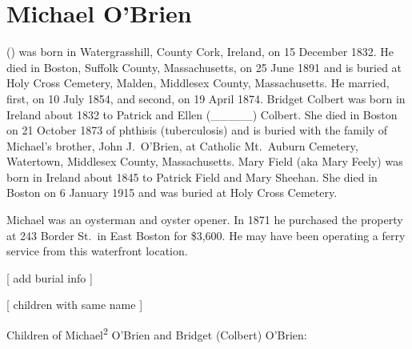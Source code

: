 \section{Michael O'Brien}

 () was born in Watergrasshill, County Cork, Ireland, on 15 December 1832.\cite{Michael2OBrienNaturalization} He died in Boston, Suffolk County, Massachusetts, on 25 June 1891\cite{Michael2OBrienDeath} and is buried at Holy Cross Cemetery, Malden, Middlesex County, Massachusetts.\cite{DianaBerberenaLetter2} He married, first,  on 10 July 1854,\cite{BridgetColbertMarriage} and second,  on 19 April 1874.\cite{MaryFieldMarriage} Bridget Colbert was born in Ireland about 1832 to Patrick and Ellen (\_\_\_\_\_) Colbert.\cite{BridgetColbertMarriage} She died in Boston on 21 October 1873 of phthisis (tuberculosis)\cite{BridgetColbertDeath} and is buried with the family of Michael's brother, John J.\ O'Brien, at Catholic Mt.\ Auburn Cemetery, Watertown, Middlesex County, Massachusetts.\cite{BillMcEvoy} Mary Field (aka Mary Feely) was born in Ireland about 1845\cite{MaryFieldMarriage} to Patrick Field and Mary Sheehan.\cite{MaryFieldDeath} She died in Boston on 6 January 1915 and was buried at Holy Cross Cemetery.\cite{MaryFieldDeath}

Michael was an oysterman and oyster opener.\cite{EdwardFrancis3OBrienBirth,Michael2OBrien1886} In 1871 he purchased the property at 243 Border St.\ in East Boston for \$3,600.\cite{243BorderPurchase,243BorderMap} He may have been operating a ferry service from this waterfront location.\cite{243BorderFerry}

[ add burial info ]

[ children with same name ]

\begin{KidsIntro}
	Children of Michael\textsuperscript{2} O'Brien and Bridget (Colbert) O'Brien:
\end{KidsIntro}


